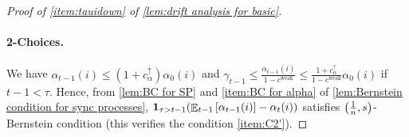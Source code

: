 \documentclass[letterpaper,11pt]{article}
\newcommand{\indicator}{\mathbf{1}}
\DeclareMathOperator*{\E}{\mathbb{E}}
\newcommand{\alphanorm}{\gamma}
\newcommand{\cweak}{c^{\mathrm{weak}}}
\newcommand{\calphaup}{c^{\uparrow}_\alpha}
\newcommand{\variance}{s}
\newcommand{\ciup}{c_\alpha^{\uparrow}}
\begin{document}
\begin{proof}[Proof of \cref{item:tauidown} of \cref{lem:drift analysis for basic}]
    

    \paragraph*{2-Choices.}
    We have $\alpha_{t-1}(i) \le (1+\ciup)\alpha_0(i)$ and $\alphanorm_{t-1}\leq \frac{\alpha_{t-1}(i)}{1-\cweak}\leq \frac{1+\calphaup}{1-\cweak}\alpha_{0}(i)$ if $ t-1 < \tau $.
Hence, from \cref{lem:BC for SP} and \cref{item:BC for alpha} of \cref{lem:Bernstein condition for sync processes}, $\indicator_{\tau>t-1}\qty(\E_{t-1}\qty[ \alpha_{t-1}(i)]-\alpha_t(i))$ satisfies $\qty(\frac{1}{n},\variance)$-Bernstein condition (this verifies the condition \ref{item:C2'}).

    


\end{proof}
\end{document}
